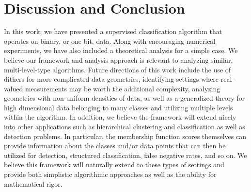 \documentclass[twoside,11pt]{article}
\newcommand{\edit}[1]{{{#1}}}
\begin{document}
\section{Discussion and Conclusion}\label{sec::conclude}
In this work, we have presented a supervised classification algorithm that operates on binary, or one-bit, data. Along with encouraging numerical experiments, we have also included a theoretical analysis for a simple case. We believe our framework and analysis approach is relevant to analyzing similar, multi-\edit{level}-type algorithms. 
Future directions of this work include the use of dithers for more complicated data geometries, \edit{identifying settings where real-valued measurements may be worth the additional complexity, analyzing geometries with non-uniform densities of data,} as well as a generalized theory for high dimensional data belonging to many classes and utilizing multiple \edit{level}s within the algorithm.  \edit{In addition, we believe the framework will extend nicely into other applications such as hierarchical clustering and classification as well as detection problems. In particular, the membership function scores themselves can provide information about the classes and/or data points that can then be utilized for detection, structured classification, false negative rates, and so on.   We believe this framework will naturally extend to these types of settings and provide both simplistic algorithmic approaches as well as the ability for mathematical rigor. }



\newpage
\appendix
\end{document}
